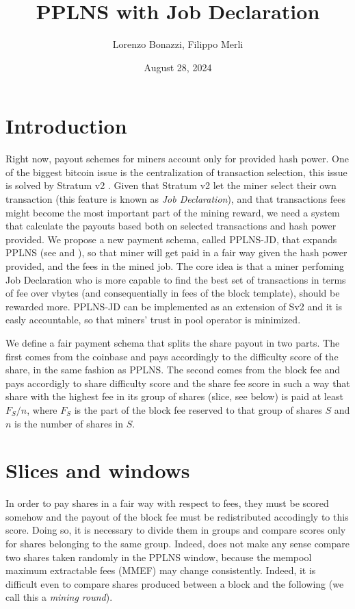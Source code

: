 \documentclass[11pt]{article}
\title{PPLNS with Job Declaration}
\author{Lorenzo Bonazzi, Filippo Merli}
\date{August 28, 2024} %
\begin{document}
\maketitle

\section{Introduction}

Right now, payout schemes for miners account only for provided hash power.
One of the biggest bitcoin issue is the centralization of transaction selection, this issue is solved by Stratum v2 \cite{sv2}. Given that Stratum v2 let the miner select their own transaction (this feature is known as \emph{Job Declaration}), and that transactions fees might become the most important part of the mining reward, we need a system that calculate the payouts based both on selected transactions and hash power provided. We propose a new payment schema, called PPLNS-JD, that expands PPLNS (see \cite{rosenfeld} and \cite{ocean}), so that miner will get paid in a fair way given the hash power provided, and the fees in the mined job. The core idea is that a miner perfoming Job Declaration who is more capable to find the best set of transactions in terms of fee over vbytes (and consequentially in fees of the block template), should be rewarded more. PPLNS-JD can be implemented as an extension of Sv2 \cite{extension} and it is easly accountable, so that miners' trust in pool operator is minimized. 

We define a fair payment schema that splits the share payout in two parts. The first comes from the coinbase and pays accordingly to the difficulty score of the share, in the same fashion as PPLNS. The second comes from the block fee and pays accordigly to share difficulty score and the share fee score in such a way that share with the highest fee in its group of shares (slice, see below) is paid at least $F_S/n$, where $F_S$ is the part of the block fee reserved to that group of shares $S$ and $n$ is the number of shares in $S$.

\section{Slices and windows}
In order to pay shares in a fair way with respect to fees, they must be scored somehow and the payout of the block fee must be redistributed accodingly to this score. Doing so, it is necessary to divide them in groups and compare scores only for shares belonging to the same group. Indeed, does not make any sense compare two shares taken randomly in the PPLNS window, because the mempool maximum extractable fees (MMEF) may change consistently. Indeed, it is difficult even to compare shares produced between a block and the following (we call this a \emph{mining round}).
\end{document}
